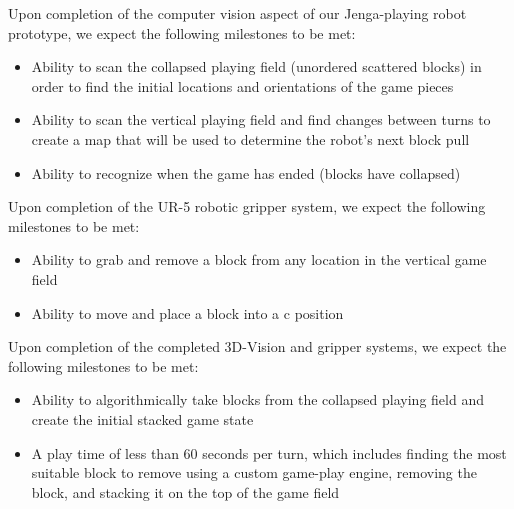 Upon completion of the computer vision aspect of our Jenga-playing robot prototype, we expect the following milestones to be met:

\begin{itemize}
  \item Ability to scan the collapsed playing field (unordered scattered blocks) in order to find the initial locations and orientations of the game pieces
  \item Ability to scan the vertical playing field and find changes between turns to create a map that will be used to determine the robot's next block pull
  \item Ability to recognize when the game has ended (blocks have collapsed)
\end{itemize}

\noindent
Upon completion of the UR-5 robotic gripper system, we expect the following milestones to be met:
\begin{itemize}
    \item Ability to grab and remove a block from any location in the vertical game field
    \item Ability to move and place a block into a c position
\end{itemize}

\noindent
Upon completion of the completed 3D-Vision and gripper systems, we expect the following milestones to be met:

\begin{itemize}
  \item Ability to algorithmically take blocks from the collapsed playing field and create the initial stacked game state
  \item A play time of less than 60 seconds per turn, which includes finding the most suitable block to remove using a custom game-play engine, removing the block, and stacking it on the top of the game field
\end{itemize}
